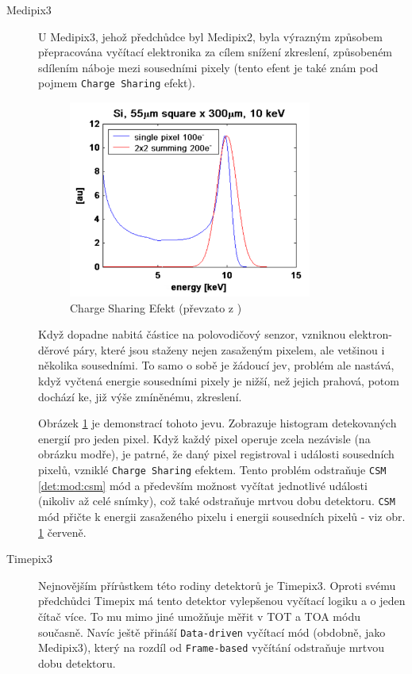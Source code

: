 \begin{description}
	\item[Medipix3] U Medipix3, jehož předchůdce byl Medipix2, byla výrazným způsobem přepracována vyčítací elektronika za cílem snížení zkreslení, způsobeném sdílením náboje mezi sousedními pixely (tento efent je také znám pod pojmem \texttt{Charge Sharing} efekt). 

	\begin{figure}[th]
	\begin{center}
		\includegraphics[width=8cm]{figures/det_charge_sharing.png}
		\caption{Charge Sharing Efekt (převzato z \cite{medipix-www})}
		\label{fig:det:charge_sharing}
	\end{center}
	\end{figure}

	Když dopadne nabitá částice na polovodičový senzor, vzniknou elektron-děrové páry, které jsou staženy nejen zasaženým pixelem, ale vetšinou i několika sousedními. To samo o sobě je žádoucí jev, problém ale nastává, když vyčtená energie sousedními pixely je nižší, než jejich prahová, potom dochází ke, již výše zmíněnému, zkreslení. 
	
	Obrázek \ref{fig:det:charge_sharing} je demonstrací tohoto jevu. Zobrazuje histogram detekovaných energií pro jeden pixel. Když každý pixel operuje zcela nezávisle (na obrázku modře), je patrné, že daný pixel registroval i události sousedních pixelů, vzniklé \texttt{Charge Sharing} efektem. Tento problém odstraňuje \texttt{CSM} \ref{det:mod:csm} mód a především možnost vyčítat jednotlivé události (nikoliv až celé snímky), což také odstraňuje mrtvou dobu detektoru. \texttt{CSM} mód přičte k energii zasaženého pixelu i energii sousedních pixelů - viz obr. \ref{fig:det:charge_sharing} červeně.

	\item[Timepix3] Nejnovějším přírůstkem této rodiny detektorů je Timepix3. Oproti svému předchůdci Timepix má tento detektor vylepšenou vyčítací logiku a o jeden čítač více. To mu mimo jiné umožňuje měřit v TOT a TOA módu současně. Navíc ještě přináší \texttt{Data-driven} vyčítací mód (obdobně, jako Medipix3), který na rozdíl od \texttt{Frame-based} vyčítání odstraňuje mrtvou dobu detektoru.

\end{description}

